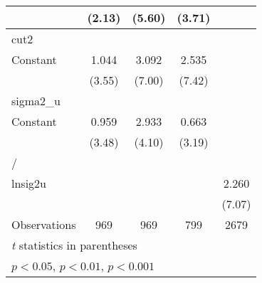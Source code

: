 {\begin{longtable}{l*{4}{c}}
                &   (2.13)         &   (5.60)         &   (3.71)         &                  \\
\hline
cut2            &                  &                  &                  &                  \\
Constant        &    1.044\sym{***}&    3.092\sym{***}&    2.535\sym{***}&                  \\
                &   (3.55)         &   (7.00)         &   (7.42)         &                  \\
\hline
sigma2\_u        &                  &                  &                  &                  \\
Constant        &    0.959\sym{***}&    2.933\sym{***}&    0.663\sym{**} &                  \\
                &   (3.48)         &   (4.10)         &   (3.19)         &                  \\
\hline
/               &                  &                  &                  &                  \\
lnsig2u         &                  &                  &                  &    2.260\sym{***}\\
                &                  &                  &                  &   (7.07)         \\
\hline
Observations    &      969         &      969         &      799         &     2679         \\
\hline\hline
\multicolumn{5}{l}{\footnotesize \textit{t} statistics in parentheses}\\
\multicolumn{5}{l}{\footnotesize \sym{*} \(p<0.05\), \sym{**} \(p<0.01\), \sym{***} \(p<0.001\)}\\
\end{longtable}
}
